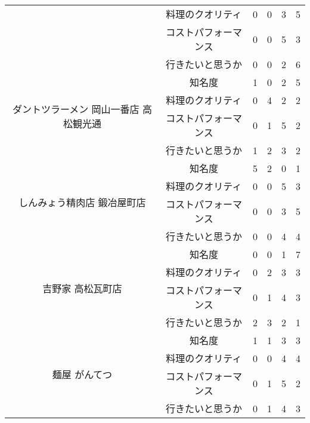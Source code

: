 \begin{table}[H]
\begin{tabular}{|c|c|r|r|r|r|}
 & 料理のクオリティ & 0 & 0 & 3 & 5 \\ \cline{2-6}
 & コストパフォーマンス & 0 & 0 & 5 & 3 \\ \cline{2-6}
 & 行きたいと思うか & 0 & 0 & 2 & 6 \\ \hline
\multirow{4}{*}{ダントツラーメン 岡山一番店 高松観光通} & 知名度 & 1 & 0 & 2 & 5 \\ \cline{2-6}
 & 料理のクオリティ & 0 & 4 & 2 & 2 \\ \cline{2-6}
 & コストパフォーマンス & 0 & 1 & 5 & 2 \\ \cline{2-6}
 & 行きたいと思うか & 1 & 2 & 3 & 2 \\ \hline
\multirow{4}{*}{しんみょう精肉店 鍛冶屋町店} & 知名度 & 5 & 2 & 0 & 1 \\ \cline{2-6}
 & 料理のクオリティ & 0 & 0 & 5 & 3 \\ \cline{2-6}
 & コストパフォーマンス & 0 & 0 & 3 & 5 \\ \cline{2-6}
 & 行きたいと思うか & 0 & 0 & 4 & 4 \\ \hline
\multirow{4}{*}{吉野家 高松瓦町店} & 知名度 & 0 & 0 & 1 & 7 \\ \cline{2-6}
 & 料理のクオリティ & 0 & 2 & 3 & 3 \\ \cline{2-6}
 & コストパフォーマンス & 0 & 1 & 4 & 3 \\ \cline{2-6}
 & 行きたいと思うか & 2 & 3 & 2 & 1 \\ \hline
\multirow{4}{*}{麺屋 がんてつ} & 知名度 & 1 & 1 & 3 & 3 \\ \cline{2-6}
 & 料理のクオリティ & 0 & 0 & 4 & 4 \\ \cline{2-6}
 & コストパフォーマンス & 0 & 1 & 5 & 2 \\ \cline{2-6}
 & 行きたいと思うか & 0 & 1 & 4 & 3 \\ \hline
\end{tabular}
\end{table}
